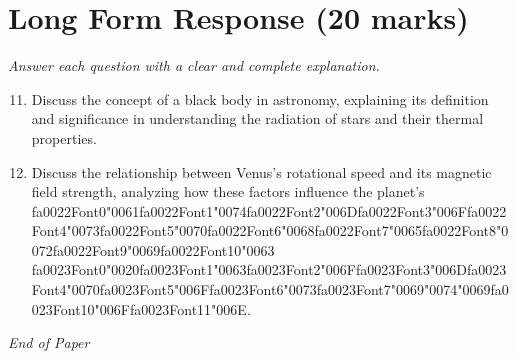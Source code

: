 \documentclass[12pt]{article}
\begin{document}
\section*{Long Form Response (20 marks)}
\textit{Answer each question with a clear and complete explanation.}
\begin{enumerate}[label=\arabic*.]
\setcounter{enumi}{10}
\item Discuss the concept of a black body in astronomy, explaining its definition and
significance in understanding the radiation of stars and their thermal properties.
\item Discuss the relationship between Venus's rotational speed and its magnetic field strength,
analyzing how these factors influence the planet's {\csname fa0022Font0\endcsname\char"0061}{\csname fa0022Font1\endcsname\char"0074}{\csname fa0022Font2\endcsname\char"006D}{\csname fa0022Font3\endcsname\char"006F}{\csname fa0022Font4\endcsname\char"0073}{\csname fa0022Font5\endcsname\char"0070}{\csname fa0022Font6\endcsname\char"0068}{\csname fa0022Font7\endcsname\char"0065}{\csname fa0022Font8\endcsname\char"0072}{\csname fa0022Font9\endcsname\char"0069}{\csname fa0022Font10\endcsname\char"0063} {\csname fa0023Font0\endcsname\char"0020}{\csname fa0023Font1\endcsname\char"0063}{\csname fa0023Font2\endcsname\char"006F}{\csname fa0023Font3\endcsname\char"006D}{\csname fa0023Font4\endcsname\char"0070}{\csname fa0023Font5\endcsname\char"006F}{\csname fa0023Font6\endcsname\char"0073}{\csname fa0023Font7\endcsname\char"0069}{\char"0074}{\char"0069}{\csname fa0023Font10\endcsname\char"006F}{\csname fa0023Font11\endcsname\char"006E}.
\end{enumerate}

\vfill
\noindent\textit{End of Paper}
\end{document}
